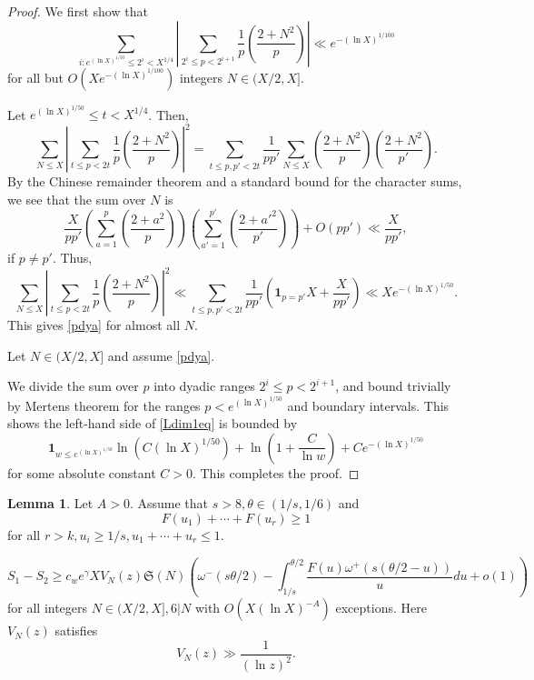 \documentclass{amsart}
\theoremstyle{definition}
\newtheorem{lem}[dfn]{Lemma}
\theoremstyle{remark}
\newcommand{\1}{
    \bm{1}
}
\begin{document}
\begin{proof}

We first show that 
\begin{equation} \sum_{i: e^{(\ln{X})^{1/50}} \leq 2^i< X^{1/4}} \left| \sum_{2^i \leq p < 2^{i+1}} \frac{1}{p} \left( \frac{2+N^2}{p} \right) \right| \ll e^{-(\ln{X})^{1/100}} \label{pdya} \end{equation}
for all but $O(X e^{-(\ln{X})^{1/100}})$ integers $N\in (X/2,X]$.  

Let $e^{(\ln{X})^{1/50}} \leq t< X^{1/4}$. Then,
\[ \sum_{N \leq X} \left| \sum_{t \leq p < 2t} \frac{1}{p} \left( \frac{2+N^2}{p} \right) \right|^2 = \sum_{t \leq p,p' < 2t} \frac{1}{p p'} \sum_{N \leq X} \left( \frac{2+N^2}{p} \right) \left( \frac{2+N^2}{p'} \right). \]
By the Chinese remainder theorem and a standard bound for the character sums, we see that the sum over $N$ is
\[ \frac{X}{pp'} \left( \sum_{a=1}^{p} \left( \frac{2+a^2}{p} \right) \right) \left( \sum_{a'=1}^{p'} \left( \frac{2+a'^2}{p'} \right) \right) + O(pp') \ll \frac{X}{pp'}, \]
if $p \neq p'$. Thus,
\[ \sum_{N \leq X} \left| \sum_{t \leq p < 2t} \frac{1}{p} \left( \frac{2+N^2}{p} \right) \right|^2 \ll \sum_{t \leq p,p' < 2t} \frac{1}{p p'} \left( \1_{p=p'} X + \frac{X}{pp'} \right) \ll X e^{-(\ln{X})^{1/50}}. \]
This gives \eqref{pdya} for almost all $N$.

Let $N \in (X/2,X]$ and assume \eqref{pdya}. 


We divide the sum over $p$ into dyadic ranges $2^i \leq p < 2^{i+1}$, and bound trivially by Mertens theorem for the ranges $p<e^{(\ln{X})^{1/50}}$ and boundary intervals. 
This shows the left-hand side of \eqref{Ldim1eq} is bounded by
\[ \1_{w\leq e^{(\ln{X})^{1/50}}} \ln{(C(\ln{X})^{1/50})} + \ln{\left( 1 + \frac{C}{\ln{w}}\right)} + C e^{-(\ln{X})^{1/50}} \]
for some absolute constant $C>0$. This completes the proof. 
\end{proof}






\begin{lem}\label{St2}
Let $A>0$. 
Assume that $s>8, \theta \in (1/s,1/6)$ and
\[ F(u_1) + \cdots + F(u_r) \geq 1 \]
for all $r>k, u_i \geq 1/s, u_1+\cdots+u_r \leq 1$.




\[ S_1 - S_2 \geq c_w e^{\gamma} X V_N(z) \mathfrak{S}(N) \left(\omega^{-}(s\theta/2) - \int_{1/s}^{\theta/2} \frac{F(u) \omega^{+}(s(\theta/2-u))}{u} du +o(1) \right) \]
for all integers $N \in (X/2,X], 6|N$ with $O(X(\ln{X})^{-A})$ exceptions. 
Here $V_N(z)$ satisfies
\[ V_N(z) \gg \frac{1}{(\ln{z})^2}. \]
\end{lem}
\end{document}
